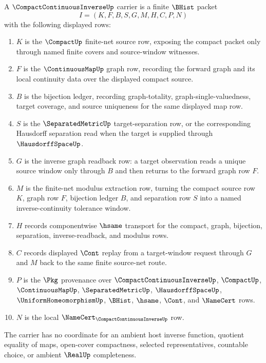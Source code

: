 \begin{definition}
\label{def:compact-continuous-inverse-carrier}
A $\CompactContinuousInverseUp$ carrier is a finite $\BHist$ packet
$$
I=(K,F,B,S,G,M,H,C,P,N)
$$
with the following displayed rows:
\begin{enumerate}
\item $K$ is the $\CompactUp$ finite-net source row, exposing the compact packet only through named finite covers and source-window witnesses.
\item $F$ is the $\ContinuousMapUp$ graph row, recording the forward graph and its local continuity data over the displayed compact source.
\item $B$ is the bijection ledger, recording graph-totality, graph-single-valuedness, target coverage, and source uniqueness for the same displayed map row.
\item $S$ is the $\SeparatedMetricUp$ target-separation row, or the corresponding Hausdorff separation read when the target is supplied through $\HausdorffSpaceUp$.
\item $G$ is the inverse graph readback row: a target observation reads a unique source window only through $B$ and then returns to the forward graph row $F$.
\item $M$ is the finite-net modulus extraction row, turning the compact source row $K$, graph row $F$, bijection ledger $B$, and separation row $S$ into a named inverse-continuity tolerance window.
\item $H$ records componentwise $\hsame$ transport for the compact, graph, bijection, separation, inverse-readback, and modulus rows.
\item $C$ records displayed $\Cont$ replay from a target-window request through $G$ and $M$ back to the same finite source-net route.
\item $P$ is the $\Pkg$ provenance over $\CompactContinuousInverseUp$, $\CompactUp$, $\ContinuousMapUp$, $\SeparatedMetricUp$, $\HausdorffSpaceUp$, $\UniformHomeomorphismUp$, $\BHist$, $\hsame$, $\Cont$, and $\NameCert$ rows.
\item $N$ is the local $\NameCert_{\CompactContinuousInverseUp}$ row.
\end{enumerate}
The carrier has no coordinate for an ambient host inverse function, quotient equality of maps, open-cover compactness, selected representatives, countable choice, or ambient $\RealUp$ completeness.
\end{definition}


